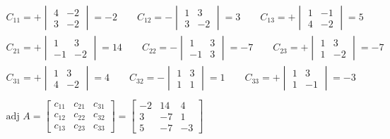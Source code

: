 \documentclass{article}
\begin{document}
   \[
  \begin{gathered}
  C_{11} = +\begin{vmatrix}
  4 & -2 \\
  3 & -2
  \end{vmatrix} = -2 \qquad C_{12} = -\begin{vmatrix}
  1 & 3 \\
  3 & -2
  \end{vmatrix} = 3 \qquad C_{13} = +\begin{vmatrix}
  1 & -1 \\
  4 & -2
  \end{vmatrix} = 5 \\
  C_{21} = +\begin{vmatrix}
  1 & 3 \\
  -1 & -2
  \end{vmatrix} = 14 \qquad C_{22} = -\begin{vmatrix}
  1 & 3 \\
  -1 & 3
  \end{vmatrix} = -7 \qquad C_{23} = +\begin{vmatrix}
  1 & 3 \\
  1 & -2
  \end{vmatrix} = -7 \\
  C_{31} = +\begin{vmatrix}
  1 & 3 \\
  4 & -2
  \end{vmatrix} = 4 \qquad C_{32} = -\begin{vmatrix}
  1 & 3 \\
  1 & 1
  \end{vmatrix} = 1 \qquad C_{33} = +\begin{vmatrix}
  1 & 3 \\
  1 & -1
  \end{vmatrix} = -3\\
  ~\\
  \text{adj }A= \begin{bmatrix}
    c_{11} &c_{21} &c_{31}\\
    c_{12} &c_{22} &c_{32}\\
    c_{13} &c_{23} &c_{33}
  \end{bmatrix}=
  \begin{bmatrix}
    -2 &14 &4\\
    3 &-7 &1\\
    5 &-7 &-3
  \end{bmatrix}
  \end{gathered}
  \]
\end{document}
